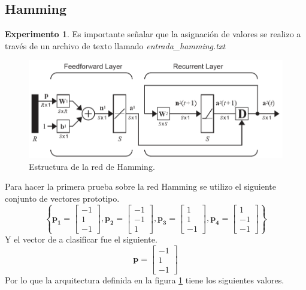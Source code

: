 \subsection{Hamming}
\textbf{Experimento 1}. Es importante señalar que la asignación de valores se realizo a través de un archivo de texto llamado \emph{entrada\_hamming.txt}
\begin{figure}[H]
    \begin{center}
        \includegraphics[width=16cm]{img/hamming/diagrama.png}
        \caption{Estructura de la red de Hamming. \cite{libro1}}
        \label{fig:hamming-diagrama2}
    \end{center}
\end{figure}
Para hacer la primera prueba sobre la red Hamming se utilizo el siguiente conjunto de vectores prototipo.
\[ \left\lbrace \boldsymbol{p_1} = \left[\begin{array}{c}-1\\ 1\\ -1\end{array}\right], \boldsymbol{p_2} = \left[\begin{array}{c}-1\\ -1\\ 1\end{array}\right], \boldsymbol{p_3} = \left[\begin{array}{c}1\\ 1\\ -1\end{array}\right], \boldsymbol{p_4} = \left[\begin{array}{c}1\\ -1\\ -1\end{array}\right] \right\rbrace \]
Y el vector de a clasificar fue el siguiente.
\[ \boldsymbol{p} = \left[\begin{array}{c}-1\\ 1\\ -1\end{array}\right] \]
Por lo que la arquitectura definida en la figura \ref{fig:hamming-diagrama2} tiene los siguientes valores.
